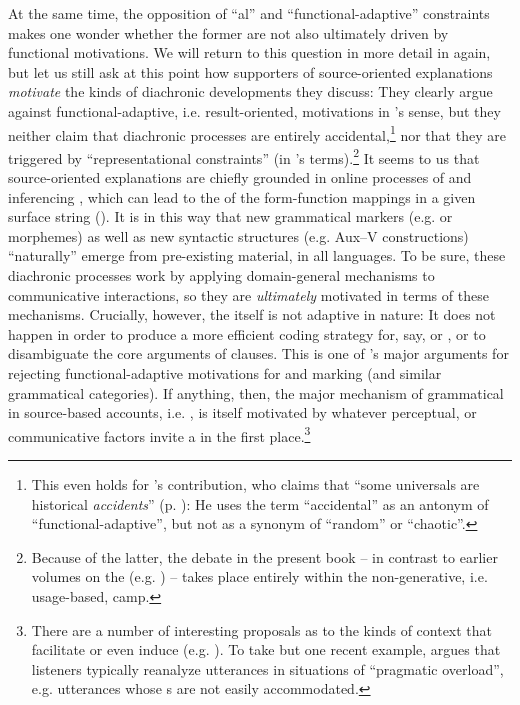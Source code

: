 \documentclass[output=paper]{langsci/langscibook}
\begin{document}
At the same time, the opposition of “al” and “functional-adaptive” constraints makes one wonder whether the former are not also ultimately driven by functional motivations. We will return to this question in more detail in  again, but let us still ask at this point how supporters of source-oriented explanations \textit{motivate} the kinds of diachronic developments they discuss: They clearly argue against functional-adaptive, i.e. result-oriented, motivations in ’s sense, but they neither claim that diachronic processes are entirely accidental,\footnote{This even holds for ’s contribution, who claims that “some universals are historical \textit{accidents}” (p. \pageref{p:collins:historicalaccidents}): He uses the term “accidental” as an anto\-nym of “functional-adaptive”, but not as a synonym of “random” or “chaotic”.} nor that they are triggered by  “representational constraints” (in ’s terms).\footnote{Because of the latter, the debate in the present book – in contrast to earlier volumes on the  (e.g. \citealt{Hawkins1988_ExplEd,Good2008_Change}) – takes place entirely within the non-generative, i.e. usage-based, camp.} It seems to us that source-oriented explanations are chiefly grounded in online processes of  and inferencing \citep{Bybee2010}, which can lead to the  of the form-function mappings in a given surface string (\citealt{Croft2000,DeSmet2009}). It is in this way that new grammatical markers (e.g.  or  morphemes) as well as new syntactic structures (e.g. Aux–V constructions) “naturally” emerge from pre-existing material, in all languages. To be sure, these diachronic processes work by applying domain-general  mechanisms to communicative interactions, so they are \textit{ultimately} motivated in terms of these mechanisms. Crucially, however, the  itself is not adaptive in nature: It does not happen in order to produce a more efficient coding strategy for, say,  or , or to disambiguate the core arguments of  clauses. This is one of ’s major arguments for rejecting functional-adaptive motivations for  and  marking (and similar grammatical categories). If anything, then, the major mechanism of grammatical  in source-based accounts, i.e. , is itself motivated by whatever perceptual,  or communicative factors invite a  in the first place.\footnote{There 
\label{fn:epilog:8}
are a number of interesting proposals as to the kinds of context that facilitate or even induce  (e.g. \citealt{DetgesWaltereit2002,HansenWaltereit2006,RosemeyerGrossman2017,SchwenterWaltereit2009,TraugottDasher2002}). To take but one recent example, \citet{Eckardt2009} argues that listeners typically reanalyze utterances in situations of “pragmatic overload”, e.g. utterances whose s are not easily accommodated.}
\end{document}

